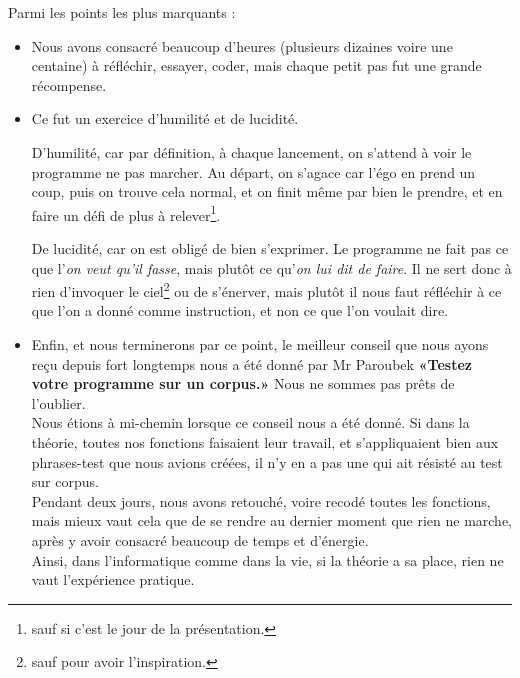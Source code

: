 Parmi les points les plus marquants :
\begin{itemize}
\item Nous avons consacré beaucoup d'heures (plusieurs dizaines voire une centaine) à réfléchir, essayer, coder, mais chaque petit pas fut une grande récompense.

\item Ce fut un exercice d'humilité et de lucidité.

D'humilité, car par définition, à chaque lancement, on s'attend à voir le programme ne pas marcher. Au départ, on s'agace car l'égo en prend un coup, puis on trouve cela normal, et on finit même par bien le prendre, et en faire un défi de plus à relever\footnote{sauf si c'est le jour de la présentation. \Smiley}.

De lucidité, car on est obligé de bien s'exprimer. Le programme ne fait pas ce que l'\emph{on veut qu'il fasse}, mais plutôt ce qu'\emph{on lui dit de faire}. Il ne sert donc à rien d'invoquer le ciel\footnote{sauf pour avoir l'inspiration.} ou de s'énerver, mais plutôt il nous faut réfléchir à ce que l'on a donné comme instruction, et non ce que l'on voulait dire. \\

\item Enfin, et nous terminerons par ce point, le meilleur conseil que nous ayons reçu depuis fort longtemps nous a été donné par Mr Paroubek \textbf{«Testez votre programme sur un corpus.»} Nous ne sommes pas prêts de l'oublier. \\

Nous étions à mi-chemin lorsque ce conseil nous a été donné. Si dans la théorie, toutes nos fonctions faisaient leur travail, et s'appliquaient bien aux phrases-test que nous avions créées, il n'y en a pas une qui ait résisté au test sur corpus. \\

Pendant deux jours, nous avons retouché, voire recodé toutes les fonctions, mais mieux vaut cela que de se rendre au dernier moment que rien ne marche, après y avoir consacré beaucoup de temps et d'énergie. \\

Ainsi, dans l'informatique comme dans la vie, si la théorie a sa place, rien ne vaut l'expérience pratique. \\
\end{itemize}










